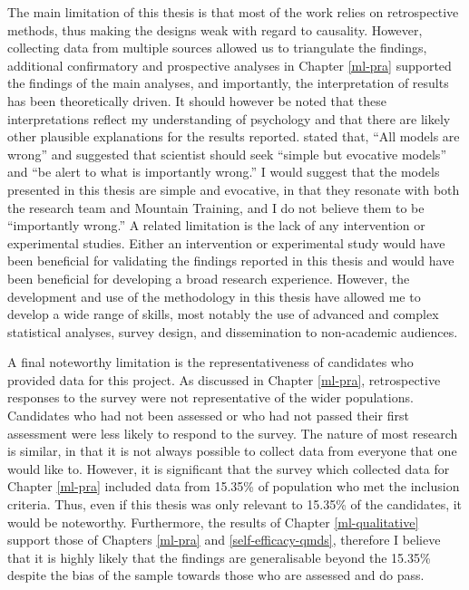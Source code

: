 \documentclass[
  12pt,
  a4paper,
]{book}
\begin{document}
The main limitation of this thesis is that most of the work relies on retrospective methods, thus making the designs weak with regard to causality. However, collecting data from multiple sources allowed us to triangulate the findings, additional confirmatory and prospective analyses in Chapter \ref{ml-pra} supported the findings of the main analyses, and importantly, the interpretation of results has been theoretically driven. It should however be noted that these interpretations reflect my understanding of psychology and that there are likely other plausible explanations for the results reported. \citet{Box1976} stated that, ``All models are wrong'' and suggested that scientist should seek ``simple but evocative models'' and ``be alert to what is importantly wrong.'' I would suggest that the models presented in this thesis are simple and evocative, in that they resonate with both the research team and Mountain Training, and I do not believe them to be ``importantly wrong.'' A related limitation is the lack of any intervention or experimental studies. Either an intervention or experimental study would have been beneficial for validating the findings reported in this thesis and would have been beneficial for developing a broad research experience. However, the development and use of the methodology in this thesis have allowed me to develop a wide range of skills, most notably the use of advanced and complex statistical analyses, survey design, and dissemination to non-academic audiences.

A final noteworthy limitation is the representativeness of candidates who provided data for this project. As discussed in Chapter \ref{ml-pra}, retrospective responses to the survey were not representative of the wider populations. Candidates who had not been assessed or who had not passed their first assessment were less likely to respond to the survey. The nature of most research is similar, in that it is not always possible to collect data from everyone that one would like to. However, it is significant that the survey which collected data for Chapter \ref{ml-pra} included data from 15.35\% of population who met the inclusion criteria. Thus, even if this thesis was only relevant to 15.35\% of the candidates, it would be noteworthy. Furthermore, the results of Chapter \ref{ml-qualitative} support those of Chapters \ref{ml-pra} and \ref{self-efficacy-qmds}, therefore I believe that it is highly likely that the findings are generalisable beyond the 15.35\% despite the bias of the sample towards those who are assessed and do pass.
\end{document}
